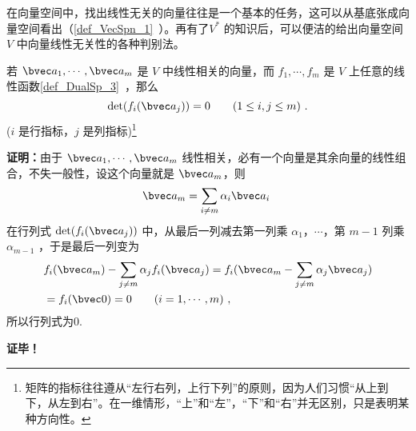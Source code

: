 
\begin{issues}
\end{issues}


在向量空间中，找出线性无关的向量往往是一个基本的任务，这可以从基底张成向量空间看出（\autoref{def_VecSpn_1}~）。再有了$V^*$ 的知识后，可以便洁的给出向量空间 $V$ 中向量线性无关性的各种判别法。

\begin{lemma}{}\label{lem_LinInD_1}
若 $\bvec a_1,\cdots,\bvec a_m$ 是 $V$ 中线性相关的向量，而 $f_1,\cdots,f_m$ 是 $V$ 上任意的线性函数\autoref{def_DualSp_3}~，那么
\begin{equation}
\det(f_i(\bvec a_j))=0\qquad (1\leq i,j\leq m)~.
\end{equation}
($i$ 是行指标，$j$ 是列指标)\footnote{矩阵的指标往往遵从“左行右列，上行下列”的原则，因为人们习惯“从上到下，从左到右”。在一维情形，“上”和“左”，“下”和“右”并无区别，只是表明某种方向性。}
\end{lemma}
\textbf{证明：}由于 $\bvec a_1,\cdots,\bvec a_m$ 线性相关，必有一个向量是其余向量的线性组合，不失一般性，设这个向量就是 $\bvec a_m$，则
\begin{equation}
\bvec a_m=\sum_{i\neq m}\alpha_i\bvec a_i~
\end{equation}
在行列式 $\det(f_i(\bvec a_j))$ 中，从最后一列减去第一列乘 $\alpha_1$，$\cdots$，第 $m-1$ 列乘 $\alpha_{m-1}$ ，于是最后一列变为
\begin{equation}
\begin{aligned}
&f_i(\bvec a_m)-\sum_{j\neq m}\alpha_j f_i(\bvec a_j)=f_i(\bvec a_m-\sum_{j\neq m}\alpha_{j}\bvec a_j)\\
&=f_i(\bvec 0)=0 \qquad (i=1,\cdots ,m)~,
\end{aligned}
\end{equation}
所以行列式为0.

\textbf{证毕！}

